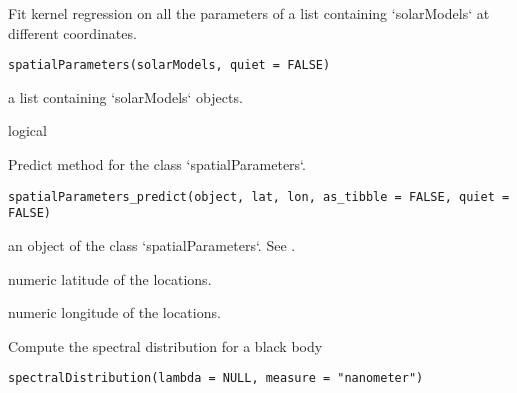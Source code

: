 \documentclass[a4paper]{book}
\begin{document}
%
\begin{Description}\relax
Fit kernel regression on all the parameters of a list containing
`solarModels` at different coordinates.
\end{Description}
%
\begin{Usage}
\begin{verbatim}
spatialParameters(solarModels, quiet = FALSE)
\end{verbatim}
\end{Usage}
%
\begin{Arguments}
\begin{ldescription}
\item[\code{solarModels}] a list containing `solarModels` objects.

\item[\code{quiet}] logical
\end{ldescription}
\end{Arguments}
%
\begin{Description}\relax
Predict method for the class `spatialParameters`.
\end{Description}
%
\begin{Usage}
\begin{verbatim}
spatialParameters_predict(object, lat, lon, as_tibble = FALSE, quiet = FALSE)
\end{verbatim}
\end{Usage}
%
\begin{Arguments}
\begin{ldescription}
\item[\code{object}] an object of the class `spatialParameters`. See .

\item[\code{lat}] numeric latitude of the locations.

\item[\code{lon}] numeric longitude of the locations.
\end{ldescription}
\end{Arguments}
%
\begin{Description}\relax
Compute the spectral distribution for a black body
\end{Description}
%
\begin{Usage}
\begin{verbatim}
spectralDistribution(lambda = NULL, measure = "nanometer")
\end{verbatim}
\end{Usage}
\end{document}
